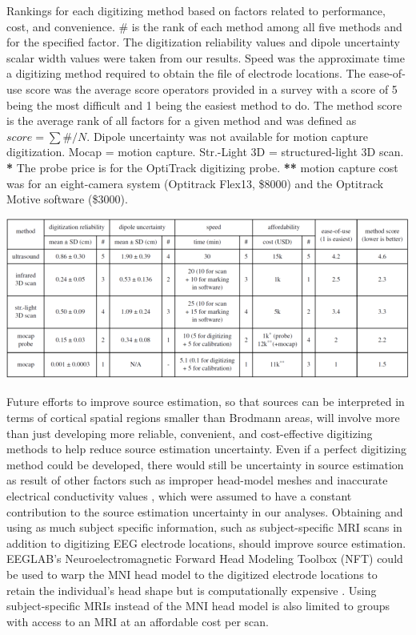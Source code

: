 \documentclass[../thesis_seyed.tex]{subfiles}
\begin{document}
\begin{table}[H]
    \centering
    \caption{Rankings for each digitizing method based on factors related to performance, cost, and convenience. \# is the rank of each method among all five methods and for the specified factor. The digitization reliability values and dipole uncertainty scalar width values were taken from our results. Speed was the approximate time a digitizing method required to obtain the file of electrode locations. The ease-of-use score was the average score operators provided in a survey with a score of 5 being the most difficult and 1 being the easiest method to do. The method score is the average rank of all factors for a given method and was defined as $score=\sum{\#}/N$. Dipole uncertainty was not available for motion capture digitization. Mocap = motion capture. Str.-Light 3D = structured-light 3D scan. \textbf{*} The probe price is for the OptiTrack digitizing probe. \textbf{**} motion capture cost was for an eight-camera system (Optitrack Flex13, \$8000) and the Optitrack Motive software (\$3000).}
    \includegraphics{../img/table1.png}
    \label{tab:t1}
\end{table}

Future efforts to improve source estimation, so that sources can be interpreted in terms of cortical spatial regions smaller than Brodmann areas, will involve more than just developing more reliable, convenient, and cost-effective digitizing methods to help reduce source estimation uncertainty. Even if a perfect digitizing method could be developed, there would still be uncertainty in source estimation as result of other factors such as improper head-model meshes and inaccurate electrical conductivity values \cite{Beltrachini2019-lf, Akalin_Acar2016-jr}, which were assumed to have a constant contribution to the source estimation uncertainty in our analyses. Obtaining and using as much subject specific information, such as subject-specific MRI scans in addition to digitizing EEG electrode locations, should improve source estimation. EEGLAB's Neuroelectromagnetic Forward Head Modeling Toolbox (NFT) could be used to warp the MNI head model to the digitized electrode locations to retain the individual's head shape but is computationally expensive \cite{Acar2010-ye}. Using subject-specific MRIs instead of the MNI head model is also limited to groups with access to an MRI at an affordable cost per scan.
\end{document}
